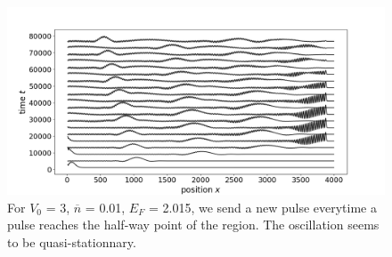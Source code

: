 \documentclass[aps,prl,preprint,groupedaddress]{revtex4-1}
\begin{document}
\begin{figure}
	\centering
	\includegraphics[width=0.7\linewidth]{../figures/plot_manypulse_t_2/plot_manypulse_L5000_V030_Ef2015_u00_n001_t_2}
	\caption{For $V_0$ = 3, $\overline{n}$ = 0.01, $E_F$ = 2.015, we send a new pulse everytime a pulse reaches the half-way point of the region. The oscillation seems to be quasi-stationnary.  }	\label{fig:plotmanypulse_t2}
\end{figure}



\end{document}
